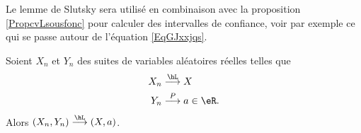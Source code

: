 Le lemme de Slutsky sera utilisé en combinaison avec la proposition \ref{PropcvLsousfonc} pour calculer des intervalles de confiance, voir par exemple ce qui se passe autour de l'équation \eqref{EqGJxxjqs}.
\begin{lemma}  \label{LemgXDlhs}
    Soient \( X_n\) et \( Y_n\) des suites de variables aléatoires réelles telles que
    \begin{equation}
        \begin{aligned}[]
            X_n&\stackrel{\hL}{\longrightarrow} X\\
            Y_n&\stackrel{P}{\longrightarrow}a\in\eR.
        \end{aligned}
    \end{equation}
    Alors \( (X_n,Y_n)\stackrel{\hL}{\longrightarrow}(X,a)\).
\end{lemma}

